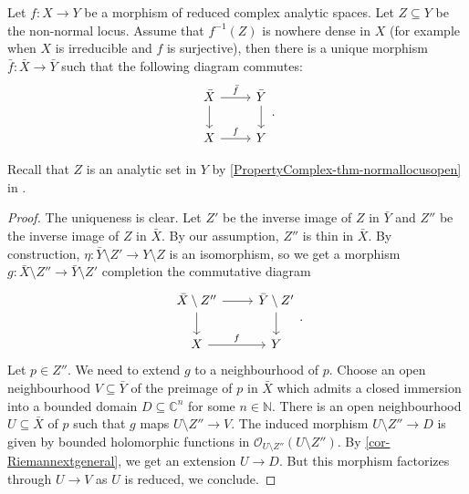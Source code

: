 \begin{corollary}\label{cor-liftmorphismtonormalization}
    Let $f:X\rightarrow Y$ be a morphism of reduced complex analytic spaces. Let $Z\subseteq Y$ be the non-normal locus. Assume that $f^{-1}(Z)$ is nowhere dense in $X$ (for example when $X$ is irreducible and $f$ is surjective), then there is a unique morphism $\bar{f}:\bar{X}\rightarrow \bar{Y}$ such that the following diagram commutes:
    \[
        \begin{tikzcd}
            \bar{X} \arrow[r, "\bar{f}"] \arrow[d] & \bar{Y} \arrow[d] \\
            X \arrow[r, "f"]                       & Y                
        \end{tikzcd}.  
    \]
\end{corollary}
Recall that $Z$ is an analytic set in $Y$ by \cref{PropertyComplex-thm-normallocusopen} in .
\begin{proof}
    The uniqueness is clear. Let $Z'$ be the inverse image of $Z$ in $\bar{Y}$ and $Z''$ be the inverse image of $Z$ in $\bar{X}$. By our assumption, $Z''$ is thin in $\bar{X}$. By construction, $\eta:\bar{Y}\setminus Z'\rightarrow Y\setminus Z$ is an isomorphism, so we get a morphism $g:\bar{X}\setminus Z''\rightarrow \bar{Y}\setminus Z'$ completion the commutative diagram
    \[
        \begin{tikzcd}
            \bar{X}\setminus Z'' \arrow[r] \arrow[d] & \bar{Y}\setminus Z' \arrow[d] \\
            X \arrow[r, "f"]                         & Y                            
        \end{tikzcd}.  
    \] 
    Let $p\in Z''$. We need to extend $g$ to a neighbourhood of $p$. Choose an open neighbourhood $V\subseteq \bar{Y}$ of the preimage of $p$ in $\bar{X}$ which admits a closed immersion into a bounded domain $D\subseteq \mathbb{C}^n$ for some $n\in \mathbb{N}$. There is an open neighbourhood $U\subseteq \bar{X}$ of $p$ such that $g$ maps $U\setminus Z''\rightarrow V$. The induced morphism $U\setminus Z''\rightarrow D$ is given by bounded holomorphic functions in $\mathcal{O}_{U\setminus Z''}(U\setminus Z'')$. By \cref{cor-Riemannextgeneral}, we get an extension $U\rightarrow D$. But this morphism factorizes through $U\rightarrow V$ as $U$ is reduced, we conclude.
\end{proof}


